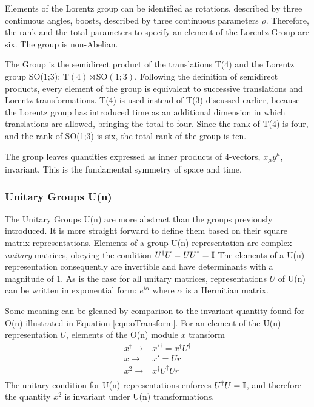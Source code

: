 Elements of the Lorentz group can be identified as rotations, described by three continuous angles, boosts, described by three continuous parameters $\rho$.
Therefore, the rank and the total parameters to specify an element of the Lorentz Group are six.
The group is non-Abelian.

The \poincare Group is the semidirect product of the translations T(4) and the Lorentz group SO(1;3): $\text{T}(4)\rtimes\text{SO}(1;3)$.
Following the definition of semidirect products, every element of the \poincare group is equivalent to successive translations and Lorentz transformations.
T(4) is used instead of T(3) discussed earlier, because the Lorentz group has introduced time as an additional dimension in which translations are allowed, bringing the total to four.
Since the rank of T(4) is four, and the rank of SO(1;3) is six, the total rank of the \poincare group is ten.


The \poincare group leaves quantities expressed as inner products of 4-vectors, $x_\mu y^\mu$, invariant.
This is the fundamental symmetry of space and time. 

\subsubsection{Unitary Groups U(n)}\label{sec:unitary}

The Unitary Groups U(n) are more abstract than the groups previously introduced.
It is more straight forward to define them based on their \nxn square matrix representations.
Elements of a group U(n) representation are complex \emph{unitary} matrices, obeying the condition $U^\dagger U=UU^\dagger=\mathbb{I}$
The elements of a U(n) representation consequently are invertible and have determinants with a magnitude of 1.
As is the case for all unitary matrices, representations $U$ of U(n) can be written in exponential form: $e^{i\alpha}$ where $\alpha$ is a Hermitian matrix.

Some meaning can be gleaned by comparison to the invariant quantity found for O(n) illustrated in Equation \ref{eqn:oTransform}.
For an element of the U(n) representation $U$, elements of the O(n) module $x$ transform 
\begin{equation}\begin{split}\label{eqn:uTransform}
    x^\dagger\to&x'^\dagger=x^\dagger U^\dagger \\
    x\to&x'=Ur \\
    x^2\to&x^\dagger U^\dagger Ur \\
\end{split}\end{equation}
The unitary condition for U(n) representations enforces $U^\dagger U=\mathbb{I}$, and therefore the quantity $x^2$ is invariant under U(n) transformations.

